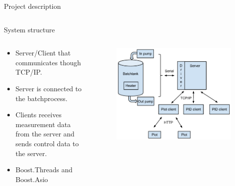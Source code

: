 \documentclass{beamer}
\begin{document}
\begin{frame}{Project description}
\begin{columns}[T]
\begin{column}{.45\textwidth}
    \end{column}
\end{columns}
\end{frame}

\begin{frame}{System structure}
\begin{columns}[T]
    \begin{column}{.55\textwidth}
        \begin{itemize}
            \item Server/Client that communicates though TCP/IP.
            \item Server is connected to the batchprocess.
            \item Clients receives measurement data from the server and sends control data to the server.
            \item Boost.Threads and Boost.Asio
        \end{itemize}
    \end{column}
    \begin{column}{.45\textwidth}

        \begin{figure}[H]
           \centering
           \includegraphics[width=1\textwidth]{systemoverview.pdf}
        \end{figure}

    \end{column}
\end{columns}
\end{frame}
\end{document}
